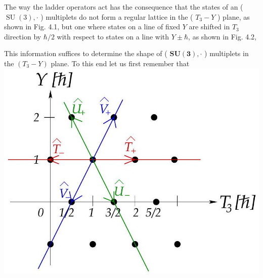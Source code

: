 \documentclass[10pt, letterpaper]{article}
\begin{document}
The way the ladder operators act has the consequence that the states of an ( $\operatorname{SU}(3), \cdot$ ) multiplets do not form a regular lattice in the ( $T_{3}-Y$ ) plane, as shown in Fig. 4.1, but one where states on a line of fixed $Y$ are shifted in $T_{3}$ direction by $\hbar / 2$ with respect to states on a line with $Y \pm \hbar$, as shown in Fig. 4.2,

This information suffices to determine the shape of ( $\boldsymbol{S} \boldsymbol{U}(\mathbf{3}), \cdot$ ) multiplets in the $\left(T_{3}-Y\right)$ plane. To this end let us first remember that\\
\includegraphics[scale=0.3, center]{2025_05_20_8618f55a41bfe980b4b2g-47}
\end{document}
